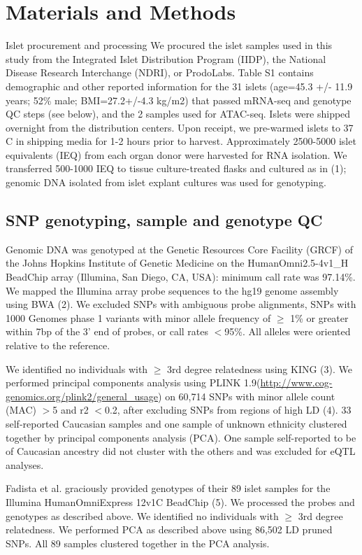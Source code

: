 \section{Materials and Methods}
Islet procurement and processing 
We procured the islet samples used in this study from the Integrated Islet Distribution Program (IIDP), the National Disease Research Interchange (NDRI), or ProdoLabs.  Table S1 contains demographic and other reported information for the 31 islets (age=45.3 +/- 11.9 years; 52\% male; BMI=27.2+/-4.3 kg/m2) that passed mRNA-seq and genotype QC steps (see below), and the 2 samples used for ATAC-seq. Islets were shipped overnight from the distribution centers.  Upon receipt, we pre-warmed islets to 37 C in shipping media for 1-2 hours prior to harvest.  Approximately 2500-5000 islet equivalents (IEQ) from each organ donor were harvested for RNA isolation. We transferred 500-1000 IEQ to tissue culture-treated flasks and cultured as in (1); genomic DNA isolated from islet explant cultures was used for genotyping.

\subsection{SNP genotyping, sample and genotype QC} 
Genomic DNA was genotyped at the Genetic Resources Core Facility (GRCF) of the Johns Hopkins Institute of Genetic Medicine on the HumanOmni2.5-4v1\_H BeadChip array (Illumina, San Diego, CA, USA): minimum call rate was 97.14\%. We mapped the Illumina array probe sequences to the hg19 genome assembly using BWA (2). We excluded SNPs with ambiguous probe alignments, SNPs with 1000 Genomes phase 1 variants with minor allele frequency of $\geq$ 1\% or greater within 7bp of the 3' end of probes, or call rates $<$95\%. All alleles were oriented relative to the reference. 

We identified no individuals with $\geq$ 3rd degree relatedness using KING (3). We performed principal components analysis using PLINK 1.9(\url{http://www.cog-genomics.org/plink2/general\_usage}) on 60,714 SNPs with minor allele count (MAC) $>$5 and r2 $<$0.2, after excluding SNPs from regions of high LD (4). 33 self-reported Caucasian samples and one sample of unknown ethnicity clustered together by principal components analysis (PCA). One sample self-reported to be of Caucasian ancestry did not cluster with the others and was excluded for eQTL analyses. 

Fadista et al. graciously provided genotypes of their 89 islet samples for the Illumina HumanOmniExpress 12v1C BeadChip (5). We processed the probes and genotypes as described above.  We identified no individuals with $\geq$ 3rd degree relatedness. We performed PCA as described above using 86,502 LD pruned SNPs. All 89 samples clustered together in the PCA analysis.

